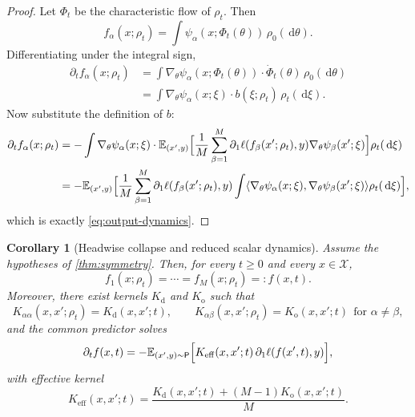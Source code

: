 \documentclass[11pt]{article}
\newtheorem{corollary}[theorem]{Corollary}
\theoremstyle{definition}
\newcommand{\E}{\mathbb{E}}
\newcommand{\dd}{\,\mathrm{d}}
\begin{document}
\begin{proof}
Let $\Phi_t$ be the characteristic flow of $\rho_t$.
Then
\[
  f_\alpha(x;\rho_t)
  =
  \int \psi_\alpha(x;\Phi_t(\theta))\,\rho_0(\dd \theta).
\]
Differentiating under the integral sign,
\begin{align*}
  \partial_t f_\alpha(x;\rho_t)
  &=
  \int
  \nabla_\theta \psi_\alpha(x;\Phi_t(\theta))
  \cdot
  \dot{\Phi}_t(\theta)\,
  \rho_0(\dd \theta)
  \\
  &=
  \int
  \nabla_\theta \psi_\alpha(x;\xi)\cdot b(\xi;\rho_t)\,
  \rho_t(\dd \xi).
\end{align*}
Now substitute the definition of $b$:
\begin{align*}
  \partial_t f_\alpha(x;\rho_t)
  &=
  -
  \int
  \nabla_\theta \psi_\alpha(x;\xi)\cdot
  \E_{(x',y)}
  \Bigl[
    \frac1M \sum_{\beta=1}^M
    \partial_1 \ell(f_\beta(x';\rho_t),y)
    \nabla_\theta \psi_\beta(x';\xi)
  \Bigr]
  \rho_t(\dd \xi)
  \\
  &=
  -
  \E_{(x',y)}
  \Bigl[
    \frac1M \sum_{\beta=1}^M
    \partial_1 \ell(f_\beta(x';\rho_t),y)
    \int
    \langle
      \nabla_\theta \psi_\alpha(x;\xi),
      \nabla_\theta \psi_\beta(x';\xi)
    \rangle
    \rho_t(\dd \xi)
  \Bigr],
\end{align*}
which is exactly \eqref{eq:output-dynamics}.
\end{proof}

\begin{corollary}[Headwise collapse and reduced scalar dynamics]
\label{cor:collapse}
Assume the hypotheses of \cref{thm:symmetry}.
Then, for every $t\ge 0$ and every $x \in \mathcal{X}$,
\[
  f_1(x;\rho_t)=\cdots=f_M(x;\rho_t)=:f(x,t).
\]
Moreover, there exist kernels $K_{\mathrm d}$ and $K_{\mathrm o}$ such that
\[
  K_{\alpha\alpha}(x,x';\rho_t)=K_{\mathrm d}(x,x';t),
  \qquad
  K_{\alpha\beta}(x,x';\rho_t)=K_{\mathrm o}(x,x';t)
  \ \ \text{for }\alpha\neq\beta,
\]
and the common predictor solves
\begin{equation}
  \partial_t f(x,t)
  =
  -
  \E_{(x',y)\sim \mathsf{P}}
  \Bigl[
    K_{\mathrm{eff}}(x,x';t)\,
    \partial_1 \ell(f(x',t),y)
  \Bigr],
  \label{eq:reduced}
\end{equation}
with effective kernel
\begin{equation}
  K_{\mathrm{eff}}(x,x';t)
  =
  \frac{K_{\mathrm d}(x,x';t)+(M-1)K_{\mathrm o}(x,x';t)}{M}.
  \label{eq:keff}
\end{equation}
\end{corollary}
\end{document}

